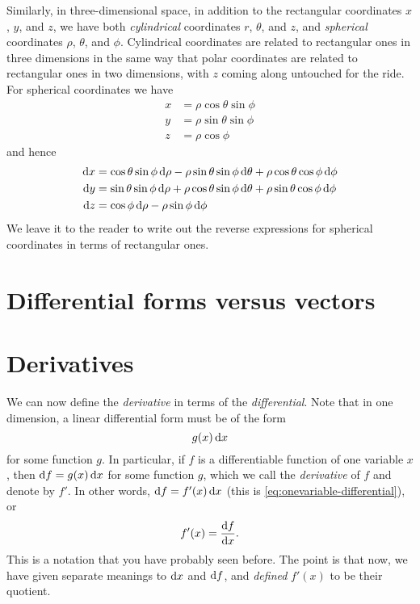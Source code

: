 \documentclass[12pt]{amsart}
\begin{document}
Similarly, in three-dimensional space, in addition to the rectangular coordinates $x$, $y$, and $z$, we have both \emph{cylindrical} coordinates $r$, $\theta$, and $z$, and \emph{spherical} coordinates $\rho$, $\theta$, and $\phi$.
Cylindrical coordinates are related to rectangular ones in three dimensions in the same way that polar coordinates are related to rectangular ones in two dimensions, with $z$ coming along untouched for the ride.
For spherical coordinates we have
\begin{align*}
  x &= \rho \cos\theta \sin\phi\\
  y &= \rho \sin\theta \sin\phi\\
  z &= \rho\cos\phi
\end{align*}
and hence
\begin{align*}
  \mathrm{d} x &= \cos\theta \sin\phi \,\mathrm{d} \rho - \rho\sin\theta\sin\phi \,\mathrm{d} \theta + \rho\cos\theta\cos\phi \,\mathrm{d} \phi\\
  \mathrm{d} y &= \sin\theta \sin\phi\,\mathrm{d} \rho + \rho\cos\theta\sin\phi \,\mathrm{d} \theta + \rho\sin\theta\cos\phi \,\mathrm{d} \phi\\
  \mathrm{d} z &= \cos\phi\,\mathrm{d} \rho - \rho\sin\phi\,\mathrm{d} \phi
\end{align*}
We leave it to the reader to write out the reverse expressions for spherical coordinates in terms of rectangular ones.


\section{Differential forms versus vectors}
\label{sec:forms-vs-vectors}


\section{Derivatives}
\label{sec:derivatives}

We can now define the \emph{derivative} in terms of the \emph{differential}.
Note that in one dimension, a linear differential form must be of the form
\[ g(x) \,\mathrm{d} x \]
for some function $g$.
In particular, if $f$ is a differentiable function of one variable $x$, then $\mathrm{d} f = g(x) \, \mathrm{d} x$ for some function $g$, which we call the \emph{derivative} of $f$ and denote by $f'$.
In other words, $\mathrm{d} f = f'(x)\,\mathrm{d} x$ (this is \cref{eq:onevariable-differential}), or
\[ f'(x) = \frac{\mathrm{d} f}{\mathrm{d} x}. \]
This is a notation that you have probably seen before.
The point is that now, we have given separate meanings to $\mathrm{d} x$ and $\mathrm{d} f$, and \emph{defined} $f'(x)$ to be their quotient.
\end{document}
